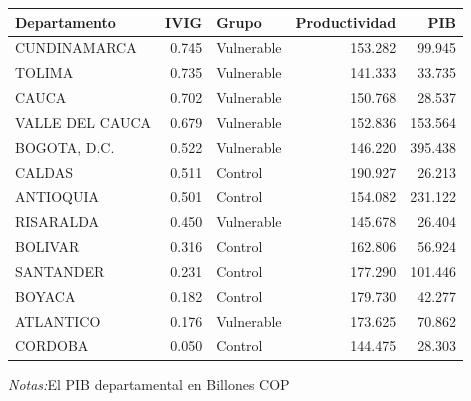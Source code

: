 \documentclass[12pt]{article}
\begin{document}
\setcounter{table}{6}
\begin{table}[htbp]
\centering
\begin{threeparttable}

\begin{tabular}{lrlrr}
\toprule
Departamento & IVIG & Grupo & Productividad & PIB\\
\midrule
CUNDINAMARCA & 0.745 & Vulnerable & 153.282 & 99.945\\
TOLIMA & 0.735 & Vulnerable & 141.333 & 33.735\\
CAUCA & 0.702 & Vulnerable & 150.768 & 28.537\\
VALLE DEL CAUCA & 0.679 & Vulnerable & 152.836 & 153.564\\
BOGOTA, D.C. & 0.522 & Vulnerable & 146.220 & 395.438\\
\addlinespace
CALDAS & 0.511 & Control & 190.927 & 26.213\\
ANTIOQUIA & 0.501 & Control & 154.082 & 231.122\\
RISARALDA & 0.450 & Vulnerable & 145.678 & 26.404\\
BOLIVAR & 0.316 & Control & 162.806 & 56.924\\
SANTANDER & 0.231 & Control & 177.290 & 101.446\\
\addlinespace
BOYACA & 0.182 & Control & 179.730 & 42.277\\
ATLANTICO & 0.176 & Vulnerable & 173.625 & 70.862\\
CORDOBA & 0.050 & Control & 144.475 & 28.303\\
\bottomrule
\end{tabular}
\begin{tablenotes}
\footnotesize
\item \textit{Notas:}El PIB departamental en Billones COP
\end{tablenotes}
\end{threeparttable}
\end{table}
\end{document}
